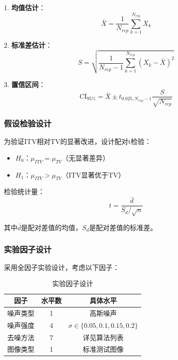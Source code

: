 \documentclass[a4paper,12pt]{ctexart}
\begin{document}
1. \textbf{均值估计}：
\begin{equation}
\bar{X} = \frac{1}{N_{rep}} \sum_{k=1}^{N_{rep}} X_k
\end{equation}

2. \textbf{标准差估计}：
\begin{equation}
S = \sqrt{\frac{1}{N_{rep}-1} \sum_{k=1}^{N_{rep}} (X_k - \bar{X})^2}
\end{equation}

3. \textbf{置信区间}：
\begin{equation}
\text{CI}_{95\%} = \bar{X} \pm t_{0.025,N_{rep}-1} \frac{S}{\sqrt{N_{rep}}}
\end{equation}

\subsubsection{假设检验设计}

为验证ITV相对TV的显著改进，设计配对t检验：

\begin{itemize}
    \item $H_0$：$\mu_{ITV} = \mu_{TV}$（无显著差异）
    \item $H_1$：$\mu_{ITV} > \mu_{TV}$（ITV显著优于TV）
\end{itemize}

检验统计量：
\begin{equation}
t = \frac{\bar{d}}{S_d/\sqrt{n}}
\end{equation}

其中$\bar{d}$是配对差值的均值，$S_d$是配对差值的标准差。

\subsubsection{实验因子设计}

采用全因子实验设计，考虑以下因子：

\begin{table}[H]
\centering
\caption{实验因子设计}
\begin{tabular}{|c|c|c|}
\hline
\textbf{因子} & \textbf{水平数} & \textbf{具体水平} \\
\hline
噪声类型 & 1 & 高斯噪声 \\
\hline
噪声强度 & 4 & $\sigma \in \{0.05, 0.1, 0.15, 0.2\}$ \\
\hline
去噪方法 & 7 & 详见算法列表 \\
\hline
图像类型 & 1 & 标准测试图像 \\
\hline
\end{tabular}
\end{table}
\end{document}
